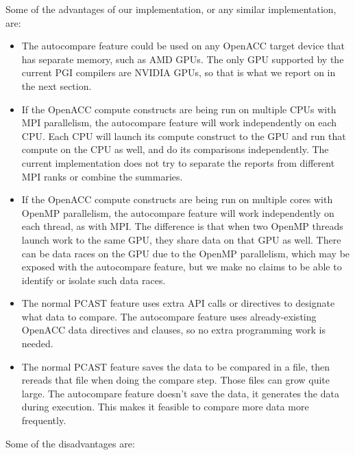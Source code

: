 Some of the advantages of our implementation, or any similar implementation, are:
\begin{itemize}
\item The autocompare feature could be used on any OpenACC target device that has separate memory, such as AMD GPUs.
The only GPU supported by the current PGI compilers are NVIDIA GPUs, so that is what we report on in the next section.
\item If the OpenACC compute constructs are being run on multiple CPUs with MPI parallelism, the autocompare feature will work independently on each CPU.
Each CPU will launch its compute construct to the GPU and run that compute on the CPU as well, and do its comparisons independently.
The current implementation does not try to separate the reports from different MPI ranks or combine the summaries.
\item If the OpenACC compute constructs are being run on multiple cores with OpenMP parallelism, the autocompare feature will work independently on each thread, as with MPI.
The difference is that when two OpenMP threads launch work to the same GPU, they share data on that GPU as well.
There can be data races on the GPU due to the OpenMP parallelism, which may be exposed with the autocompare feature, but we make no claims to be able to identify or isolate such data races.
\item The normal PCAST feature uses extra API calls or directives to designate what data to compare.
The autocompare feature uses already-existing OpenACC data directives and clauses, so no extra programming work is needed.
\item The normal PCAST feature saves the data to be compared in a file, then rereads that file when doing the compare step.
Those files can grow quite large.
The autocompare feature doesn't save the data, it generates the data during execution.
This makes it feasible to compare more data more frequently.
\end{itemize}
Some of the disadvantages are:
